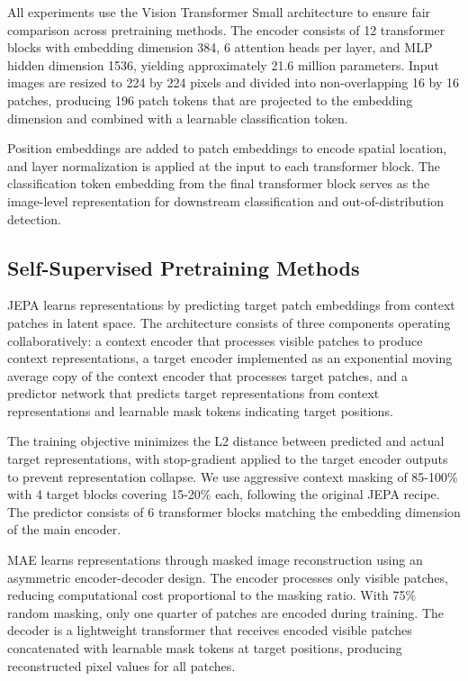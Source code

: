 \documentclass[11pt,a4paper]{article}
\begin{document}
All experiments use the Vision Transformer Small architecture to ensure fair comparison across pretraining methods. The encoder consists of 12 transformer blocks with embedding dimension 384, 6 attention heads per layer, and MLP hidden dimension 1536, yielding approximately 21.6 million parameters. Input images are resized to 224 by 224 pixels and divided into non-overlapping 16 by 16 patches, producing 196 patch tokens that are projected to the embedding dimension and combined with a learnable classification token.

Position embeddings are added to patch embeddings to encode spatial location, and layer normalization is applied at the input to each transformer block. The classification token embedding from the final transformer block serves as the image-level representation for downstream classification and out-of-distribution detection.

\subsection{Self-Supervised Pretraining Methods}

JEPA learns representations by predicting target patch embeddings from context patches in latent space. The architecture consists of three components operating collaboratively: a context encoder that processes visible patches to produce context representations, a target encoder implemented as an exponential moving average copy of the context encoder that processes target patches, and a predictor network that predicts target representations from context representations and learnable mask tokens indicating target positions.

The training objective minimizes the L2 distance between predicted and actual target representations, with stop-gradient applied to the target encoder outputs to prevent representation collapse. We use aggressive context masking of 85-100\% with 4 target blocks covering 15-20\% each, following the original JEPA recipe. The predictor consists of 6 transformer blocks matching the embedding dimension of the main encoder.

MAE learns representations through masked image reconstruction using an asymmetric encoder-decoder design. The encoder processes only visible patches, reducing computational cost proportional to the masking ratio. With 75\% random masking, only one quarter of patches are encoded during training. The decoder is a lightweight transformer that receives encoded visible patches concatenated with learnable mask tokens at target positions, producing reconstructed pixel values for all patches.
\end{document}
